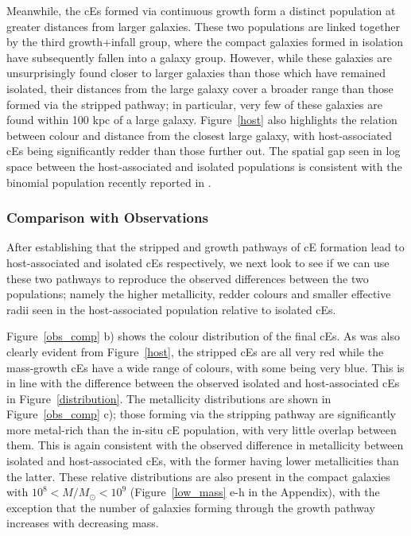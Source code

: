 \documentclass[a4paper,fleqn,usenatbib]{mnras}
\begin{document}
Meanwhile, the cEs formed via continuous growth form a distinct population at greater distances from larger galaxies. These two populations are linked together by the third growth+infall group, where the compact galaxies formed in isolation have subsequently fallen into a galaxy group. However, while these galaxies are unsurprisingly found closer to larger galaxies than those which have remained isolated, their distances from the large galaxy cover a broader range than those formed via the stripped pathway; in particular, very few of these galaxies are found within 100 kpc of a large galaxy. Figure~\ref{host} also highlights the relation between colour and distance from the closest large galaxy, with host-associated cEs being significantly redder than those further out. The spatial gap seen in log space between the host-associated and isolated populations is consistent with the binomial population recently reported in \citet{2022ApJ...934L..35C}. 



\subsubsection{Comparison with Observations}

After establishing that the stripped and growth pathways of cE formation lead to host-associated and isolated cEs respectively, we next look to see if we can use these two pathways to reproduce the observed differences between the two populations; namely the higher metallicity, redder colours and smaller effective radii seen in the host-associated population relative to isolated cEs. 

Figure~\ref{obs_comp} b) shows the colour distribution of the final cEs. As was also clearly evident from Figure~\ref{host}, the stripped cEs are all very red while the mass-growth cEs have a wide range of colours, with some being very blue. This is in line with the difference between the observed isolated and host-associated cEs in Figure~\ref{distribution}. The metallicity distributions are shown in Figure~\ref{obs_comp} c); those forming via the stripping pathway are significantly more metal-rich than the in-situ cE population, with very little overlap between them. This is again consistent with the observed difference in metallicity between isolated and host-associated cEs, with the former having lower metallicities than the latter. These relative distributions are also present in the compact galaxies with $10^{8} < M/M_{\odot} < 10^{9}$ (Figure~\ref{low_mass} e-h in the Appendix), with the exception that the number of galaxies forming through the growth pathway increases with decreasing mass. 
\end{document}
